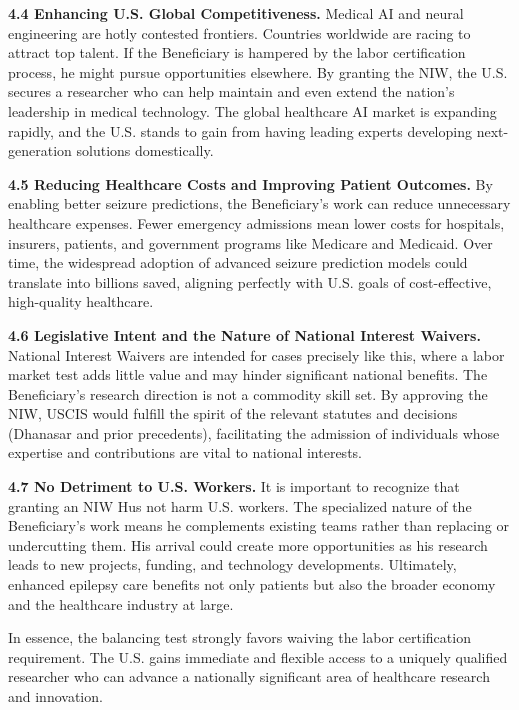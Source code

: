 \documentclass{article}
\begin{document}
{\bf 4.4 Enhancing U.S. Global Competitiveness.}
Medical AI and neural engineering are hotly contested frontiers. Countries worldwide are racing to attract top talent. If the Beneficiary is hampered by the labor certification process, he might pursue opportunities elsewhere. By granting the NIW, the U.S. secures a researcher who can help maintain and even extend the nation’s leadership in medical technology. The global healthcare AI market is expanding rapidly, and the U.S. stands to gain from having leading experts developing next-generation solutions domestically.


{\bf 4.5 Reducing Healthcare Costs and Improving Patient Outcomes.}
By enabling better seizure predictions, the Beneficiary’s work can reduce unnecessary healthcare expenses. Fewer emergency admissions mean lower costs for hospitals, insurers, patients, and government programs like Medicare and Medicaid. Over time, the widespread adoption of advanced seizure prediction models could translate into billions saved, aligning perfectly with U.S. goals of cost-effective, high-quality healthcare.


{\bf 4.6 Legislative Intent and the Nature of National Interest Waivers.}
National Interest Waivers are intended for cases precisely like this, where a labor market test adds little value and may hinder significant national benefits. The Beneficiary’s research direction is not a commodity skill set. By approving the NIW, USCIS would fulfill the spirit of the relevant statutes and decisions (Dhanasar and prior precedents), facilitating the admission of individuals whose expertise and contributions are vital to national interests.

{\bf 4.7 No Detriment to U.S. Workers.}
It is important to recognize that granting an NIW Hus not harm U.S. workers. The specialized nature of the Beneficiary’s work means he complements existing teams rather than replacing or undercutting them. His arrival could create more opportunities as his research leads to new projects, funding, and technology developments. Ultimately, enhanced epilepsy care benefits not only patients but also the broader economy and the healthcare industry at large.

In essence, the balancing test strongly favors waiving the labor certification requirement. The U.S. gains immediate and flexible access to a uniquely qualified researcher who can advance a nationally significant area of healthcare research and innovation.

\clearpage
\end{document}

